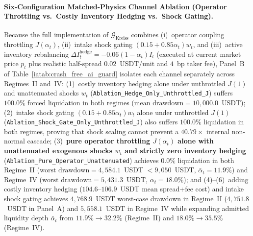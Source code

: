 \documentclass[12pt]{article}
\theoremstyle{definition}
\theoremstyle{remark}
\begin{document}
\paragraph{Six-Configuration Matched-Physics Channel Ablation (Operator Throttling vs.\ Costly Inventory Hedging vs.\ Shock Gating).}
Because the full implementation of $\mathcal{G}_{\mathrm{Kreiss}}$ combines (i)~operator coupling throttling $J(\alpha_t)$, (ii)~intake shock gating $(0.15 + 0.85\alpha_t)w_t$, and (iii)~active inventory rebalancing $\Delta I^{\mathrm{hedge}}_t = -0.06(1-\alpha_t)I_t$ (executed at current market price $p_t$ plus realistic half-spread $0.02$~USDT/unit and $4$~bp taker fee), Panel~B of Table~\ref{iatab:crash_free_ai_guard} isolates each channel separately across Regimes~II and~IV: (1)~costly inventory hedging alone under unthrottled $J(1)$ and unattenuated shocks $w_t$ (\texttt{Ablation\_Hedge\_Only\_Unthrottled\_J}) suffers $100.0\%$ forced liquidation in both regimes ($\text{mean drawdown} = 10{,}000.0$~USDT); (2)~intake shock gating $(0.15+0.85\alpha_t)w_t$ alone under unthrottled $J(1)$ (\texttt{Ablation\_Shock\_Gate\_Only\_Unthrottled\_J}) also suffers $100.0\%$ liquidation in both regimes, proving that shock scaling cannot prevent a $40.79\times$ internal non-normal cascade; (3)~\textbf{pure operator throttling $J(\alpha_t)$ alone with unattenuated exogenous shocks $w_t$ and strictly zero inventory hedging} (\texttt{Ablation\_Pure\_Operator\_Unattenuated}) achieves $0.0\%$ liquidation in both Regime~II ($\text{worst drawdown} = 4{,}584.1$~USDT $< 9{,}050$~USDT, $\bar{\alpha}_t = 11.9\%$) and Regime~IV ($\text{worst drawdown} = 5{,}431.3$~USDT, $\bar{\alpha}_t = 18.0\%$); and (4)--(6)~adding costly inventory hedging ($104.6$--$106.9$~USDT mean spread+fee cost) and intake shock gating achieves $4{,}768.9$~USDT worst-case drawdown in Regime~II ($4{,}751.8$~USDT in Panel~A) and $5{,}558.1$~USDT in Regime~IV while expanding admitted liquidity depth $\bar{\alpha}_t$ from $11.9\% \to 32.2\%$ (Regime~II) and $18.0\% \to 35.5\%$ (Regime~IV).
\end{document}

